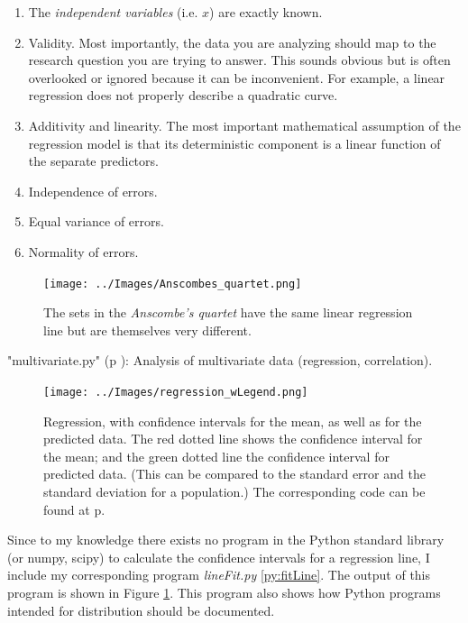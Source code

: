 \begin{enumerate}
  \item The \emph{independent variables} (i.e. $x$) are exactly known.
  \item Validity. Most importantly, the data you are analyzing should map to the research question you are trying to answer. This sounds obvious but is often overlooked or ignored because it can be inconvenient. For example, a linear regression does not properly describe a quadratic curve.
  \item Additivity and linearity. The most important mathematical assumption of the regression model is that its deterministic component is a linear function of the separate predictors.
  \item Independence of errors.
  \item Equal variance of errors.
  \item Normality of errors.
\end{enumerate}

\begin{figure}
  \centering
  \texttt{[image: ../Images/Anscombes\_quartet.png]}\\
  \caption{The sets in the \emph{Anscombe's quartet} have the same linear regression line but are themselves very different.}
\end{figure}

\PyImg "multivariate.py" (p \pageref{py:multivariate}): Analysis of multivariate data (regression, correlation).

\begin{figure}
  \centering
  \texttt{[image: ../Images/regression\_wLegend.png]}\\
  \caption{Regression, with confidence intervals for the mean, as well as for the predicted data. The red dotted line shows the confidence interval for the mean; and the green dotted line the confidence interval for predicted data. (This can be compared to the standard error and the standard deviation for a population.) The corresponding code can be found
  at p. \pageref{py:fitLine}} \label{fig:regline}
\end{figure}

Since to my knowledge there exists no program in the Python standard library (or numpy, scipy) to calculate the confidence intervals for a regression line, I include my corresponding program \emph{lineFit.py} \ref{py:fitLine}. The output of this program is shown in Figure \ref{fig:regline}. This program also shows how Python programs intended for distribution should be documented.

